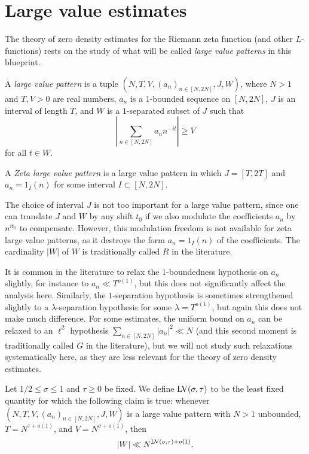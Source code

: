 \chapter{Large value estimates}

The theory of zero density estimates for the Riemann zeta function (and other $L$-functions) rests on the study of what will be called \emph{large value patterns} in this blueprint.

\begin{definition}\label{large-pattern-def} A \emph{large value pattern} is a tuple $(N, T, V, (a_n)_{n \in [N,2N]}, J, W)$, where $N > 1$ and $T, V > 0$ are real numbers, $a_n$ is a $1$-bounded sequence on $[N,2N]$, $J$ is an interval of length $T$, and $W$ is a $1$-separated subset of $J$ such that
\begin{equation}\label{V-large}
        \left|\sum_{n \in [N,2N]} a_n n^{-it} \right| \geq V
\end{equation}
for all $t \in W$.

A \emph{Zeta large value pattern} is a large value pattern in which $J = [T,2T]$ and $a_n = 1_I(n)$ for some interval $I \subset [N,2N]$.
\end{definition}

The choice of interval $J$ is not too important for a large value pattern, since one can translate $J$ and $W$ by any shift $t_0$ if we also modulate the coefficients $a_n$ by $n^{it_0}$ to compensate.  However, this modulation freedom is not available for zeta large value patterns, as it destroys the form $a_n = 1_I(n)$ of the coefficients.  The cardinality $|W|$ of $W$ is traditionally called $R$ in the literature.

It is common in the literature to relax the $1$-boundedness hypothesis on $a_n$ slightly, for instance to $a_n \ll T^{o(1)}$, but this does not significantly affect the analysis here.  Similarly, the $1$-separation hypothesis is sometimes strengthened slightly to a $\lambda$-separation hypothesis for some $\lambda = T^{o(1)}$, but again this does not make much difference.  For some estimates, the uniform bound on $a_n$ can be relaxed to an $\ell^2$ hypothesis $\sum_{n \in [N,2N]} |a_n|^2 \ll N$ (and this second moment is traditionally called $G$ in the literature), but we will not study such relaxations systematically here, as they are less relevant for the theory of zero density estimates.

\begin{definition}\label{lv-def} Let $1/2 \leq \sigma \leq 1$ and $\tau \geq 0$ be fixed. We define $\mathrm{LV}(\sigma,\tau)$ to be the least fixed quantity for which the following claim is true: whenever $(N,T,V,(a_n)_{n \in [N,2N]},J,W)$ is a large value pattern with $N>1$ unbounded, $T = N^{\tau+o(1)}$, and $V = N^{\sigma+o(1)}$, then
$$ |W| \ll N^{\mathrm{LV}(\sigma,\tau)+o(1)}.$$
\end{definition}

